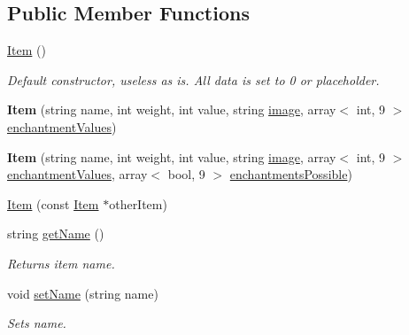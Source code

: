 \subsection*{Public Member Functions}
\begin{DoxyCompactItemize}
\item 
\hypertarget{class_item_a297720c02984eab37332ae795d22189d}{}\label{class_item_a297720c02984eab37332ae795d22189d} 
\hyperlink{class_item_a297720c02984eab37332ae795d22189d}{Item} ()
\begin{DoxyCompactList}\small\item\em Default constructor, useless as is. All data is set to 0 or placeholder. \end{DoxyCompactList}\item 
\hypertarget{class_item_a2df43264bafca3a31662a163cf2b5a3d}{}\label{class_item_a2df43264bafca3a31662a163cf2b5a3d} 
{\bfseries Item} (string name, int weight, int value, string \hyperlink{class_item_add84a42b692ee5d580a92ae4a922f784}{image}, array$<$ int, 9 $>$ \hyperlink{class_item_a8532d8729f9433f41b7fc18b20d83236}{enchantment\+Values})
\item 
\hypertarget{class_item_a96a72e69b788044a98b5f675ae5cfb7c}{}\label{class_item_a96a72e69b788044a98b5f675ae5cfb7c} 
{\bfseries Item} (string name, int weight, int value, string \hyperlink{class_item_add84a42b692ee5d580a92ae4a922f784}{image}, array$<$ int, 9 $>$ \hyperlink{class_item_a8532d8729f9433f41b7fc18b20d83236}{enchantment\+Values}, array$<$ bool, 9 $>$ \hyperlink{class_item_a02a91e8112849f4e2fde342b0c9a0d47}{enchantments\+Possible})
\item 
\hyperlink{class_item_a2f0671713504024a4b63cd63c835f759}{Item} (const \hyperlink{class_item}{Item} $\ast$other\+Item)
\item 
\hypertarget{class_item_a63d7f2148b699e539aae354b01559811}{}\label{class_item_a63d7f2148b699e539aae354b01559811} 
string \hyperlink{class_item_a63d7f2148b699e539aae354b01559811}{get\+Name} ()
\begin{DoxyCompactList}\small\item\em Returns item name. \end{DoxyCompactList}\item 
\hypertarget{class_item_a5dcdff1db4c66ca22bd6a3f826c69644}{}\label{class_item_a5dcdff1db4c66ca22bd6a3f826c69644} 
void \hyperlink{class_item_a5dcdff1db4c66ca22bd6a3f826c69644}{set\+Name} (string name)
\begin{DoxyCompactList}\small\item\em Sets name. \end{DoxyCompactList}\item 

\end{DoxyCompactItemize}
